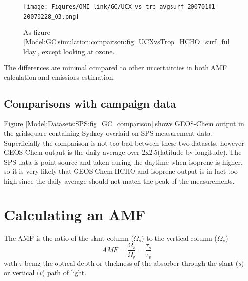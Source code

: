       
      \begin{figure}
        \texttt{[image: Figures/OMI\_link/GC/UCX\_vs\_trp\_avgsurf\_20070101-20070228\_O3.png]}
        \caption{%
          As figure \ref{Model:GC:simulation:comparison:fig_UCXvsTrop_HCHO_surf_fullday}, except looking at ozone. 
        }
        \label{Model:GC:simulation:comparison:fig_UCXvsTrop_O3_surf_fullday}
      \end{figure}
      
      The differences are minimal compared to other uncertainties in both AMF calculation and emissions estimation.
  
  \subsection{Comparisons with campaign data}
    
    Figure \ref{Model:Datasets:SPS:fig_GC_comparison} shows GEOS-Chem output in the gridsquare containing Sydney overlaid on SPS measurement data.
    Superficially the comparison is not too bad between these two datasets, however GEOS-Chem output is the daily average over 2x2.5\degr (latitude by longitude).
    The SPS data is point-source and taken during the daytime when isoprene is higher, so it is very likely that GEOS-Chem HCHO and isoprene output is in fact too high since the daily average should not match the peak of the measurements.
    
      
\section{Calculating an AMF}
  \label{Model:AMF}
  
  The AMF is the ratio of the slant column ($\Omega_s$) to the vertical column ($\Omega_v$)
  \begin{equation} \label{Model:AMF:eqn_AMFFrac}
    AMF=\frac{\Omega_s}{\Omega_v} = \frac{\tau_s}{\tau_v}
  \end{equation}
  with $\tau$ being the optical depth or thickness of the absorber through the slant (\textit{s}) or vertical (\textit{v}) path of light.
  
